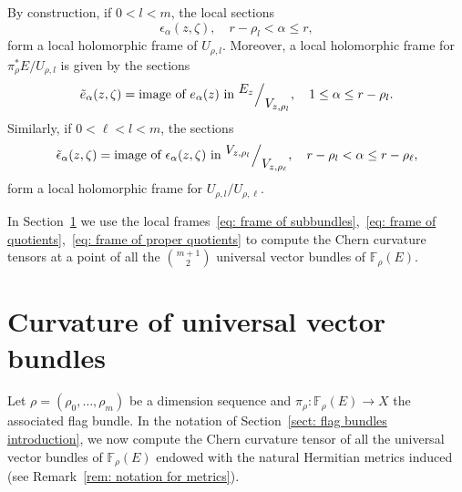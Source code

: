 \documentclass[a4paper]{amsart}
\theoremstyle{plain}%
\theoremstyle{definition}
\theoremstyle{remark}
\newcommand{\FF}{\mathbb{F}}
\begin{document}
By construction, if $ 0 < l < m $, the local sections
\begin{equation}\label{eq: frame of subbundles}
	\epsilon_\alpha (z,\zeta) , \quad r-\rho_{l} < \alpha \le r ,
\end{equation}
form a local holomorphic frame of $ U_{\rho,l} $.
Moreover, a local holomorphic frame for $ \pi_{\rho}^{*}E/U_{\rho,l} $ is given by the sections
\begin{equation}\label{eq: frame of quotients}
	\tilde{e}_\alpha (z,\zeta) = \text{image of $ e_\alpha(z) $ in $ ^{\textstyle E_{z}}\Big/_{\textstyle V_{z,\rho_l}} $} , \quad 1 \le \alpha \le r-\rho_{l} .
\end{equation}
Similarly, if $ 0 < \ell < l < m $, the sections
\begin{equation}\label{eq: frame of proper quotients}
	\tilde{\epsilon}_\alpha (z,\zeta) = \text{image of $ \epsilon_\alpha(z,\zeta) $ in $ ^{\textstyle V_{z,\rho_l}}\Big/_{\textstyle V_{z,\rho_{\ell}}} $} , \quad r-\rho_{l} < \alpha \le r-\rho_{\ell} ,
\end{equation}
form a local holomorphic frame for $ U_{\rho,l}/U_{\rho,\ell} $.

In Section~\ref{sect: curvature universal bundles} we use the local frames~\eqref{eq: frame of subbundles},~\eqref{eq: frame of quotients},~\eqref{eq: frame of proper quotients} to compute the Chern curvature tensors at a point of all the $ \binom{m+1}{2} $ universal vector bundles of $ \FF_{\rho}(E) $.


\section{Curvature of universal vector bundles}\label{sect: curvature universal bundles}
Let $ \rho = (\rho_{0},\dots,\rho_{m}) $ be a dimension sequence and $ \pi_{\rho} \colon \FF_{\rho}(E) \to X $ the associated flag bundle.
In the notation of Section~\ref{sect: flag bundles introduction}, we now compute the Chern curvature tensor of all the universal vector bundles of $ \FF_{\rho}(E) $ endowed with the natural Hermitian metrics induced (see Remark~\ref{rem: notation for metrics}).
\end{document}
